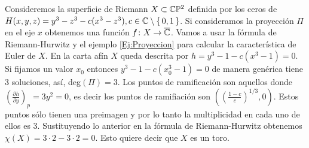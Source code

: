 \begin{Ejemplo}
\label{Ej:HToros}
Consideremos la superficie de Riemann $X\subset\mathbb{C}\mathbb{P}^2$ definida por los ceros de $H(x,y,z)=y^{3}-z^{3}-c(x^{3}-z^{3}), c\in\mathbb{C}\setminus\{\, 0,1 \, \}$. Si consideramos la proyección $\Pi$ en el eje $x$ obtenemos una función $f\colon X\rightarrow \overline{\mathbb{C}}$. Vamos a usar la fórmula de Riemann-Hurwitz y el ejemplo \ref{Ej:Proyeccion} para calcular la característica de Euler de $X$. En la carta afín $X$ queda descrita por $h=y^{3}-1-c(x^{3}-1)=0$. Si fijamos un valor $x_{0}$ entonces $y^{3}-1-c(x_{0}^{3}-1)=0$ de manera genérica tiene 3 soluciones, así, deg$(\Pi)=3$. Los puntos de ramificación son aquellos donde $(\tfrac{\partial h}{\partial y})_{p}=3y^{2}=0$, es decir los puntos de ramifiación son $((\tfrac{1-c}{c})^{1/3},0)$. Estos puntos sólo tienen una preimagen y por lo tanto la multiplicidad en cada uno de ellos es 3. Sustituyendo lo anterior en la fórmula de Riemann-Hurwitz obtenemos $\chi(X)=3\cdot 2-3\cdot 2=0$. Esto quiere decir que $X$ es un toro. 
\end{Ejemplo} 
